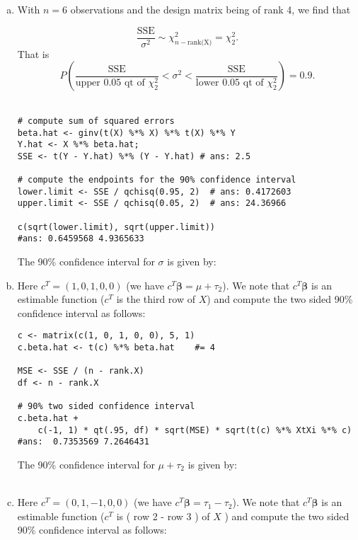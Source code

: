 \documentclass[paper=a4, fontsize=11pt]{scrartcl} %
\newcommand{\vecBeta}{\mathbf{\beta}}
\begin{document}
\begin{enumerate}[(a)]
\item With $n = 6$ observations and the design matrix being of rank 4, we find that 

$$\frac{\text{SSE}}{ \sigma^2}  \sim \chi^2_{n - \text{rank(X)}} = \chi^2_{2}.$$
That is
$$
P \left(\frac{\text{SSE}}{\text{upper  0.05 } \text{qt of }\chi^2_{2} }  <  \sigma^2 < \frac{\text{SSE}}{\text{lower  0.05 } \text{qt of }\chi^2_{2}}  \right) = 0.9.
$$\\
\begin{lstlisting}[basicstyle=\ttfamily\small\bfseries]
# compute sum of squared errors
beta.hat <- ginv(t(X) %*% X) %*% t(X) %*% Y
Y.hat <- X %*% beta.hat;  
SSE <- t(Y - Y.hat) %*% (Y - Y.hat) # ans: 2.5

# compute the endpoints for the 90% confidence interval
lower.limit <- SSE / qchisq(0.95, 2)  # ans: 0.4172603
upper.limit <- SSE / qchisq(0.05, 2)  # ans: 24.36966

c(sqrt(lower.limit), sqrt(upper.limit))
#ans: 0.6459568 4.9365633
\end{lstlisting}
The 90\% confidence interval for $\sigma$ is given by:
\\

\pagebreak

\item  Here $c^T = (1, 0, 1, 0, 0)$ (we have $c^T \vecBeta = \mu + \tau_2$). We note that 
 $c^T \vecBeta$ is an estimable function ($c^T$ is the third row of $X$) and compute the
 two sided 90\% confidence interval as follows:\\
 
 \begin{lstlisting}[basicstyle=\ttfamily\small\bfseries]
c <- matrix(c(1, 0, 1, 0, 0), 5, 1)
c.beta.hat <- t(c) %*% beta.hat    #= 4

MSE <- SSE / (n - rank.X)  
df <- n - rank.X

# 90% two sided confidence interval
c.beta.hat + 
    c(-1, 1) * qt(.95, df) * sqrt(MSE) * sqrt(t(c) %*% XtXi %*% c)
#ans:  0.7353569 7.2646431
\end{lstlisting}

 The 90\% confidence interval for $\mu + \tau_2$ is given by:
\\
 \\
 

\item  Here $c^T = (0, 1, -1, 0, 0)$ (we have $c^T \vecBeta = \tau_1 - \tau_2$). We note that 
 $c^T \vecBeta$ is an estimable function ($c^T$ is ( row 2 - row 3 ) of $X$  ) and compute the
 two sided 90\% confidence interval as follows:\\
 

\end{enumerate}
\end{document}
